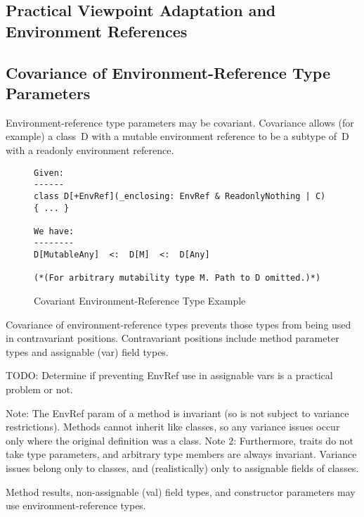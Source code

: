 \subsection{Practical Viewpoint Adaptation and Environment References}


\subsection{Covariance of Environment-Reference Type Parameters}

Environment-reference type parameters may be covariant.
Covariance allows (for example) a class~{\cd D} with a mutable environment reference to be a subtype of~{\cd D} with a readonly environment reference.

\begin{figure}[htbp]
\begin{lstlisting}
Given:
------
class D[+EnvRef](_enclosing: EnvRef & ReadonlyNothing | C) { ... }

We have:
--------
D[MutableAny]  <:  D[M]  <:  D[Any]

(*(For arbitrary mutability type M. Path to D omitted.)*)
\end{lstlisting}
\caption{Covariant Environment-Reference Type Example}
\label{fig:cov-env-ref}
\end{figure}

Covariance of environment-reference types prevents those types from being used in contravariant positions.
Contravariant positions include method parameter types and assignable ({\cd var}) field types.

TODO: Determine if preventing EnvRef use in assignable vars is a practical problem or not.

Note: The EnvRef param of a method is invariant (so is not subject to variance restrictions). Methods cannot inherit like classes, so any variance issues occur only where the original definition was a class.
Note 2: Furthermore, traits do not take type parameters, and arbitrary type members are always invariant. Variance issues belong only to classes, and (realistically) only to assignable fields of classes.

Method results, non-assignable ({\cd val}) field types, and constructor parameters may use environment-reference types.


